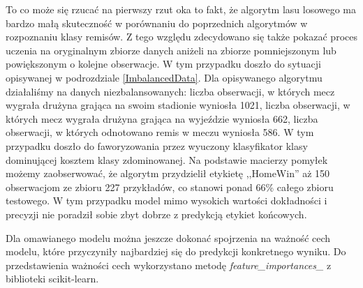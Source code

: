 To co może się rzucać na pierwszy rzut oka to fakt, że algorytm lasu losowego ma bardzo małą skuteczność w porównaniu do poprzednich algorytmów w rozpoznaniu klasy remisów. Z tego względu zdecydowano się także pokazać proces uczenia na oryginalnym zbiorze danych aniżeli na zbiorze pomniejszonym lub powiększonym o kolejne obserwacje. W tym przypadku doszło do sytuacji opisywanej w podrozdziale \ref{ImbalancedData}. Dla opisywanego algorytmu działaliśmy na danych niezbalansowanych: liczba obserwacji, w których mecz wygrała drużyna grająca na swoim stadionie wyniosła 1021, liczba obserwacji, w których mecz wygrała drużyna grająca na wyjeździe wyniosła 662, liczba obserwacji, w których odnotowano remis w meczu wyniosła 586. W tym przypadku doszło do faworyzowania przez wyuczony klasyfikator klasy dominującej kosztem klasy zdominowanej. Na podstawie macierzy pomyłek możemy zaobserwować, że algorytm przydzielił etykietę ,,HomeWin'' aż 150 obserwacjom ze zbioru 227 przykładów, co stanowi ponad 66\% całego zbioru testowego. W tym przypadku model mimo wysokich wartości dokładności i precyzji nie poradził sobie zbyt dobrze z predykcją etykiet końcowych.


Dla omawianego modelu można jeszcze dokonać spojrzenia na ważność cech modelu, które przyczyniły najbardziej się do predykcji konkretnego wyniku. Do przedstawienia ważności cech wykorzystano metodę \textit{feature\_importances\_} z biblioteki scikit-learn.

